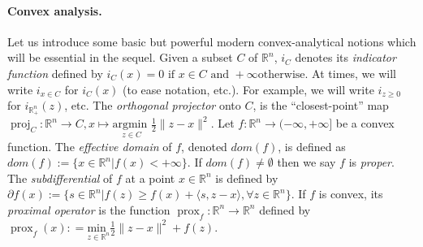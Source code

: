 \documentclass[a4paper,9pt]{extarticle}
\DeclareMathOperator{\proj}{proj}
\DeclareMathOperator{\prox}{prox}
\begin{document}
\paragraph*{Convex analysis.} Let us introduce some basic but powerful
modern convex-analytical
notions which will be essential in the sequel. Given a subset $C$ of
$\mathbb{R}^n$, $i_C$ denotes its \textit{indicator function} defined
by $i_C(x) = 0 \text{ if } x \in C\text{ and }+\infty\text{
    otherwise}$.
At times, we will write $i_{x \in C}$ for $i_C(x)$ (to ease notation,
etc.). For example, we will write $i_{z \ge 0}$ for
$i_{\mathbb{R}^n_+}(z)$, etc.  The \textit{orthogonal projector} onto $C$, is the
``closest-point'' map $\proj_C: \mathbb{R}^n \rightarrow C, x
  \mapsto \underset{z \in
      C}{\text{argmin }}\frac{1}{2}\|z-x\|^2$.
Let $f : \mathbb{R}^n \rightarrow
(-\infty, +\infty]$ be a
  convex function. The \textit{effective domain} of $f$, denoted
  $dom(f)$, is defined as
$dom(f) := \{x \in \mathbb{R}^n | f(x) < +\infty\}$.
 If $dom(f) \ne \emptyset$ then we say $f$ is \textit{proper}.
The \textit{subdifferential} of $f$ at a point $x \in \mathbb{R}^n$ is
defined by
$\partial f(x) := \{s\in \mathbb{R}^n | f(z)  \ge f(x) + \langle s, z -
x\rangle, \forall z \in \mathbb{R}^n\}$.
If $f$ is convex, its
\textit{proximal operator} is the function $\prox_f: \mathbb{R}^n
\rightarrow \mathbb{R}^n$ defined by $\prox_f(x): = \underset{z \in
  \mathbb{R}^n}{\text{min }}\frac{1}{2}\|z
  - x\|^2 + f(z)$.
\end{document}
